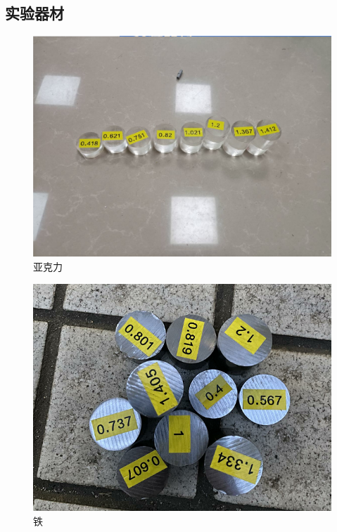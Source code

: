 \documentclass[UTF8]{gapd}
\begin{document}
\subsection{实验器材}
\begin{figure}[H]%
	\centering
	\includegraphics[width=1.1\columnwidth]{images/亚克力}
	\caption{亚克力}
	\label{fig:P2}%
\end{figure}
\begin{figure}[H]%
	\centering
	\includegraphics[width=1.1\columnwidth]{images/铁}
	\caption{铁}
	\label{fig:P2}%
\end{figure}
\end{document}
